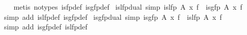 \begin{isabellebody}
%
\isadelimproof
\ \ %
\endisadelimproof
%
\isatagproof
{}\isamarkupfalse%
\ {}metis\ {}no{}types{}\ is{}fp{}def\ is{}gfp{}def{}%
\endisatagproof
{\isafoldproof}%
%
\isadelimproof
\isanewline
%
\endisadelimproof
\isanewline
{}\isamarkupfalse%
\ is{}lfp{}dual\ {}simp{}{}\ {}is{}lfp\ {}A{}{}\ x\ f\ {}\ is{}gfp\ A\ x\ f{}\isanewline
%
\isadelimproof
\ \ %
\endisadelimproof
%
\isatagproof
{}\isamarkupfalse%
\ {}simp\ add{}\ is{}lfp{}def\ is{}gfp{}def{}%
\endisatagproof
{\isafoldproof}%
%
\isadelimproof
\isanewline
%
\endisadelimproof
\isanewline
{}\isamarkupfalse%
\ is{}gfp{}dual\ {}simp{}{}\ {}is{}gfp\ {}A{}{}\ x\ f\ {}\ is{}lfp\ A\ x\ f{}\isanewline
%
\isadelimproof
\ \ %
\endisadelimproof
%
\isatagproof
{}\isamarkupfalse%
\ {}simp\ add{}\ is{}gfp{}def\ is{}lfp{}def{}%
\endisatagproof
{\isafoldproof}%
%
\isadelimproof

\end{isabellebody}
